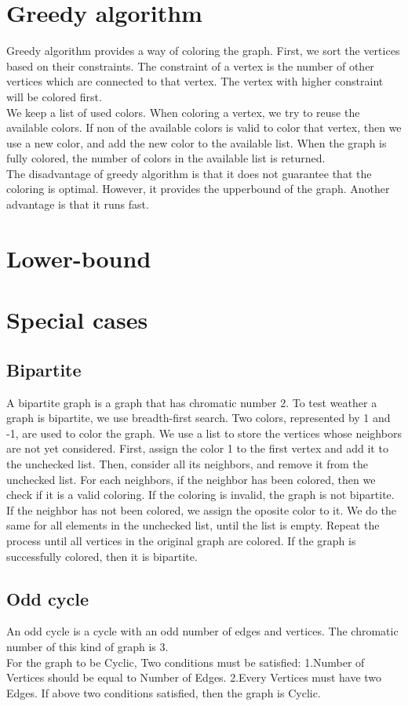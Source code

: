 \documentclass[a4paper]{report}
\begin{document}
		\section{Greedy algorithm}
		Greedy algorithm provides a way of coloring the graph. First, we sort the vertices based on their constraints. The constraint of a vertex is  the number of other vertices which are connected to that vertex. The vertex with higher constraint will be colored first.\\
		We keep a list of used colors. When coloring a vertex, we try to reuse the available colors. If non of the available colors is valid to color that vertex, then we use a new color, and add the new color to the available list. When the graph is fully colored, the number of colors in the available list is returned.\\
		The disadvantage of greedy algorithm is that it does not guarantee that the coloring is optimal. However, it provides the upperbound of the graph. Another advantage is that it runs fast.
		
		\section{Lower-bound}
		
		\section{Special cases}
			\subsection{Bipartite}
			A bipartite graph is a graph that has chromatic number 2. To test weather a graph is bipartite, we use breadth-first search. Two colors, represented by 1 and -1, are used to color the graph. We use a list to store the vertices whose neighbors are not yet considered. First, assign the color 1 to the first vertex and add it to the unchecked list. Then, consider all its neighbors, and remove it from the unchecked list. For each neighbors, if the neighbor has been colored, then we check if it is a valid coloring. If the coloring is invalid, the graph is not bipartite. If the neighbor has not been colored, we assign the oposite color to it. We do the same for all elements in the unchecked list, until the list is empty. Repeat the process until all vertices in the original graph are colored. If the graph is successfully colored, then it is bipartite.
			\subsection{Odd cycle}
			An odd cycle is a cycle with an odd number of edges and vertices. The chromatic number of this kind of graph is 3. \\
			For the graph to be Cyclic, Two conditions must be satisfied:
			1.Number of Vertices should be equal to Number of Edges.
			2.Every Vertices must have two Edges.
			If above two conditions satisfied, then  the graph is Cyclic.
			
\end{document}
